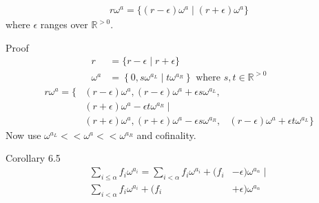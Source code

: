 \documentclass{article}
\newcommand{\R}{\mathbb{R}}
\newcommand{\curly}[1]{\left\{ #1 \right\}}
\newcommand{\w}{\omega}
\begin{document}
\begin{align*}
	r\w^a = \{(r - \epsilon) \w^a \mid (r+\epsilon)\w^a\}
\end{align*}
where $\epsilon$ ranges over $\R^{>0}$.

Proof
\begin{align*}
	r &= \{r - \epsilon \mid r + \epsilon\} \\
	\w^a &= \curly{0, s\w^{a_L} \mid t\w^{a_R}} \text{ where } s,t \in \R^{>0}
\end{align*}
\begin{align*}
	r\w^a = \{
	&(r - \epsilon) \w^a, (r - \epsilon)\w^a + \epsilon s \w^{a_L}, \\
	&(r + \epsilon) \w^a - \epsilon t \w^{a_R} \mid \\
	&(r + \epsilon) \w^a, (r + \epsilon)\w^a - \epsilon s \w^{a_R},
	&(r - \epsilon) \w^a + \epsilon t \w^{a_L} \}
\end{align*}
Now use $\w^{a_L} << \w^a << \w^{a_R}$ and cofinality.

Corollary 6.5
\begin{align*}
	\sum_{i \leq \alpha} f_i\w^{a_i} =
	\sum_{i < \alpha} f_i\w^{a_i} + (f_i &- \epsilon) \w^{a_\alpha} \mid \\
	\sum_{i < \alpha} f_i\w^{a_i} + (f_i &+ \epsilon) \w^{a_\alpha}
\end{align*}
\end{document}
